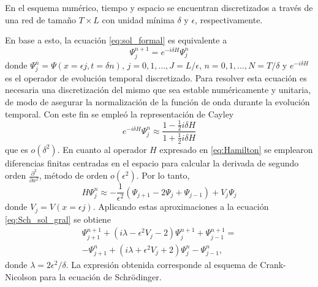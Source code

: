 \documentclass[aps,prb,twocolumn,superscriptaddress,floatfix,longbibliography]{revtex4-2}
\newcounter{para}
\begin{document}
En el esquema numérico, tiempo y espacio se encuentran discretizados a través de una red de tamaño $T \times L$ con unidad mínima $\delta$ y $\epsilon$, respectivamente.

En base a esto, la ecuación \ref{eq:sol_formal} es equivalente a
\begin{equation}
\Psi_j^{n+1} = e^{-i\delta H} \Psi_j^n
\label{eq:Sch_sol_gral}
\end{equation}
donde $\Psi_j^n = \Psi(x = \epsilon j, t = \delta n)$, $j = 0, 1, \ldots, J = L/\epsilon$, $n = 0, 1, \ldots, N = T/\delta$ y $e^{-i\delta H}$ es el operador de evolución temporal discretizado. Para resolver esta ecuación es necesaria una discretización del mismo que sea estable numéricamente y unitaria, de modo de asegurar la normalización de la función de onda durante la evolución temporal. Con este fin se empleó la representación de Cayley
\[e^{-i\delta H} \Psi_j^n \approx \frac{1 - \frac{1}{2} i \delta H}{1 + \frac{1}{2} i \delta H} \]
que es $o(\delta^2)$. En cuanto al operador $H$ expresado en \ref{eq:Hamilton} se emplearon diferencias finitas centradas en el espacio para calcular la derivada de segundo orden $\frac{\partial^2}{\partial x^2}$, método de orden $o(\epsilon^2)$. Por lo tanto,
\begin{equation}
H \Psi_j^n \approx -\frac{1}{\epsilon^2}(\Psi_{j+1} - 2 \Psi_j + \Psi_{j-1}) + V_j \Psi_j
\label{eq_Hamilton_numerico}
\end{equation}
donde $V_j = V(x = \epsilon j)$. Aplicando estas aproximaciones a la ecuación \ref{eq:Sch_sol_gral} se obtiene
\begin{multline}
\Psi_{j+1}^{n+1} + (i \lambda - \epsilon^2 V_j - 2 ) \Psi_j^{n+1} + \Psi_{j-1}^{n+1} = \\ -\Psi_{j+1}^n + (i \lambda + \epsilon^2 V_j + 2) \Psi_j^n - \Psi_{j-1}^n,
\label{eq:Crank-Nicolson}
\end{multline}
donde $\lambda = 2 \epsilon^2/\delta$. La expresión obtenida corresponde al esquema de Crank-Nicolson para la ecuación de Schrödinger.
\end{document}
